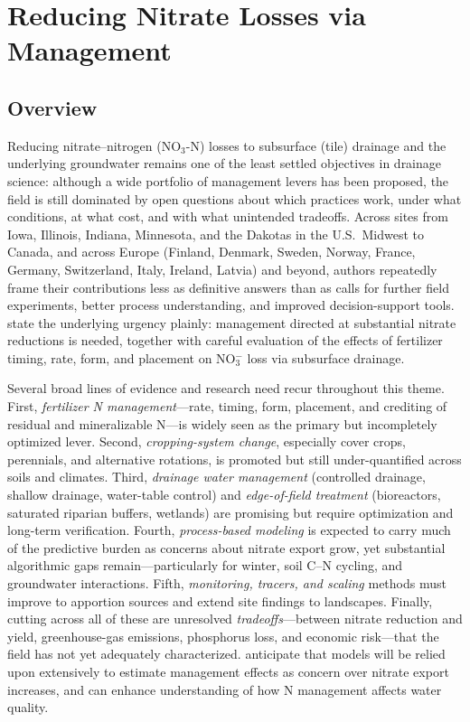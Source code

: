 \documentclass[11pt]{article}
\begin{document}
\section*{Reducing Nitrate Losses via Management}

\subsection{Overview}
Reducing nitrate--nitrogen (NO$_3$-N) losses to subsurface (tile) drainage and the underlying groundwater remains one of the least settled objectives in drainage science: although a wide portfolio of management levers has been proposed, the field is still dominated by open questions about which practices work, under what conditions, at what cost, and with what unintended tradeoffs. Across sites from Iowa, Illinois, Indiana, Minnesota, and the Dakotas in the U.S.\ Midwest to Canada, and across Europe (Finland, Denmark, Sweden, Norway, France, Germany, Switzerland, Italy, Ireland, Latvia) and beyond, authors repeatedly frame their contributions less as definitive answers than as calls for further field experiments, better process understanding, and improved decision-support tools. \textcite{ROSSI1991} state the underlying urgency plainly: management directed at substantial nitrate reductions is needed, together with careful evaluation of the effects of fertilizer timing, rate, form, and placement on NO$_3^-$ loss via subsurface drainage.

Several broad lines of evidence and research need recur throughout this theme. First, \emph{fertilizer N management}---rate, timing, form, placement, and crediting of residual and mineralizable N---is widely seen as the primary but incompletely optimized lever. Second, \emph{cropping-system change}, especially cover crops, perennials, and alternative rotations, is promoted but still under-quantified across soils and climates. Third, \emph{drainage water management} (controlled drainage, shallow drainage, water-table control) and \emph{edge-of-field treatment} (bioreactors, saturated riparian buffers, wetlands) are promising but require optimization and long-term verification. Fourth, \emph{process-based modeling} is expected to carry much of the predictive burden as concerns about nitrate export grow, yet substantial algorithmic gaps remain---particularly for winter, soil C--N cycling, and groundwater interactions. Fifth, \emph{monitoring, tracers, and scaling} methods must improve to apportion sources and extend site findings to landscapes. Finally, cutting across all of these are unresolved \emph{tradeoffs}---between nitrate reduction and yield, greenhouse-gas emissions, phosphorus loss, and economic risk---that the field has not yet adequately characterized. \textcite{Du2017} anticipate that models will be relied upon extensively to estimate management effects as concern over nitrate export increases, and can enhance understanding of how N management affects water quality.
\end{document}
